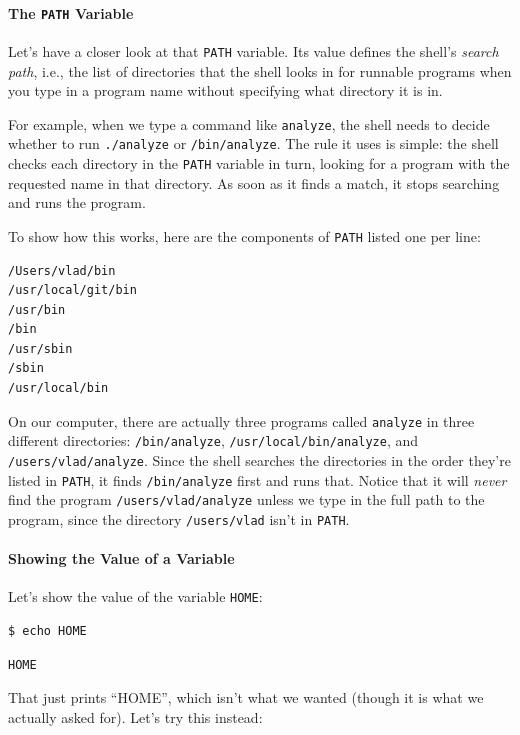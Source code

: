 \documentclass[]{book}
\newcommand{\gdef}[2]{\emph{#2}}
\begin{document}
\mbox{}\paragraph{The \texttt{PATH} Variable}

Let's have a closer look at that \texttt{PATH} variable. Its value
defines the shell's \gdef{g:search-path}{search path}, i.e., the
list of directories that the shell looks in for runnable programs when
you type in a program name without specifying what directory it is in.

For example, when we type a command like \texttt{analyze}, the shell
needs to decide whether to run \texttt{./analyze} or
\texttt{/bin/analyze}. The rule it uses is simple: the shell checks each
directory in the \texttt{PATH} variable in turn, looking for a program
with the requested name in that directory. As soon as it finds a match,
it stops searching and runs the program.

To show how this works, here are the components of \texttt{PATH} listed
one per line:

\begin{verbatim}
/Users/vlad/bin
/usr/local/git/bin
/usr/bin
/bin
/usr/sbin
/sbin
/usr/local/bin
\end{verbatim}

On our computer, there are actually three programs called
\texttt{analyze} in three different directories: \texttt{/bin/analyze},
\texttt{/usr/local/bin/analyze}, and \texttt{/users/vlad/analyze}. Since
the shell searches the directories in the order they're listed in
\texttt{PATH}, it finds \texttt{/bin/analyze} first and runs that.
Notice that it will \emph{never} find the program
\texttt{/users/vlad/analyze} unless we type in the full path to the
program, since the directory \texttt{/users/vlad} isn't in
\texttt{PATH}.

\mbox{}\paragraph{Showing the Value of a Variable}

Let's show the value of the variable \texttt{HOME}:

\begin{verbatim}
$ echo HOME
\end{verbatim}

\begin{verbatim}
HOME
\end{verbatim}

That just prints ``HOME'', which isn't what we wanted (though it is what
we actually asked for). Let's try this instead:
\end{document}
